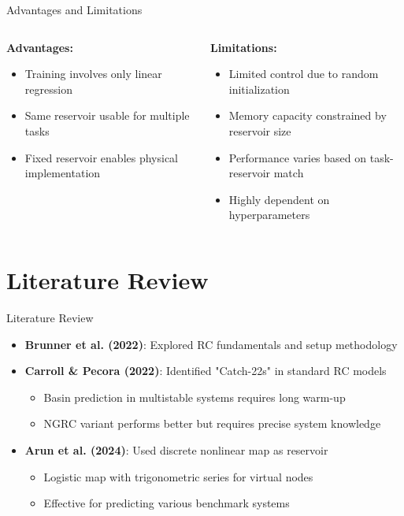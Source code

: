 \documentclass{beamer}
\begin{document}
\begin{frame}{Advantages and Limitations}
\begin{columns}
\begin{column}{0.5\textwidth}
\textbf{Advantages:}
\begin{itemize}
\item Training involves only linear regression
\item Same reservoir usable for multiple tasks
\item Fixed reservoir enables physical implementation
\end{itemize}
\end{column}
\begin{column}{0.5\textwidth}
\textbf{Limitations:}
\begin{itemize}
\item Limited control due to random initialization
\item Memory capacity constrained by reservoir size
\item Performance varies based on task-reservoir match
\item Highly dependent on hyperparameters
\end{itemize}
\end{column}
\end{columns}
\end{frame}

\section{Literature Review}

\begin{frame}{Literature Review}
\begin{itemize}
\item \textbf{Brunner et al. (2022)}: Explored RC fundamentals and setup methodology
\item \textbf{Carroll \& Pecora (2022)}: Identified "Catch-22s" in standard RC models
    \begin{itemize}
    \item Basin prediction in multistable systems requires long warm-up
    \item NGRC variant performs better but requires precise system knowledge
    \end{itemize}
\item \textbf{Arun et al. (2024)}: Used discrete nonlinear map as reservoir
    \begin{itemize}
    \item Logistic map with trigonometric series for virtual nodes
    \item Effective for predicting various benchmark systems
    \end{itemize}
\end{itemize}
\end{frame}
\end{document}
